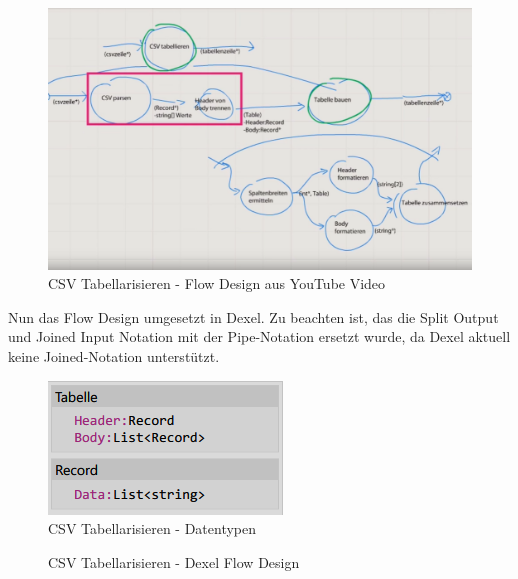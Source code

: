 \begin{figure}[H]
	\centering
	\includegraphics[width=1\linewidth]{./img/youtubeflowdesign.png}
	\caption{CSV Tabellarisieren - Flow Design aus YouTube Video}
\end{figure}


Nun das Flow Design umgesetzt in Dexel. Zu beachten ist, das die Split Output und Joined Input Notation mit der Pipe-Notation ersetzt wurde, da Dexel aktuell keine Joined-Notation unterstützt.


\begin{figure}[H]
	\centering
	\includegraphics[width=0.4\linewidth]{./img/csvtabellierenDexelDataTypes.png}
	\caption{CSV Tabellarisieren - Datentypen}
\end{figure}




\begin{landscape}
\begin{figure}
	\thispagestyle{empty}
	    \hspace*{-1.5cm}

	\caption{CSV Tabellarisieren - Dexel Flow Design}
\end{figure}
\end{landscape}






